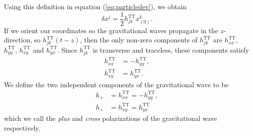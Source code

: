 Using this definition in equation (\ref{eq:particledev}), we obtain
\begin{equation}
\delta x^j = \frac{1}{2} h_{jk}^\mathrm{TT} x_{(0)}^k.
\end{equation}
If we orient our coordinates so the gravitational waves propagate in the
$z$-direction, so $h_{jk}^\mathrm{TT}(t-z)$, then the only non-zero components
of $h_{jk}^\mathrm{TT}$ are $h_{xx}^\mathrm{TT}$, $h_{yy}^\mathrm{TT}$,
$h_{xy}^\mathrm{TT}$ and $h_{yx}^\mathrm{TT}$. Since $h_{jk}^\mathrm{TT}$ is
transverse and traceless, these components satisfy
\begin{align}
h_{xx}^\mathrm{TT} &= - h_{yy}^\mathrm{TT}, \\
h_{xy}^\mathrm{TT} &= h_{yx}^\mathrm{TT}.
\end{align}
We define the two independent components of the gravitational wave to be
\begin{align}
h_{+} &= h_{xx}^\mathrm{TT} = - h_{yy}^\mathrm{TT}, \\
h_{\times} &= h_{xy}^\mathrm{TT} = h_{yx}^\mathrm{TT}
\end{align}
which we call the \emph{plus} and \emph{cross} polarizations of the
gravitational wave respectively.


